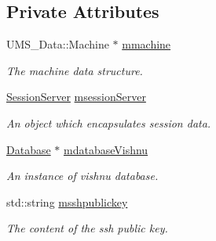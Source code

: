 \subsection*{Private Attributes}
\begin{DoxyCompactItemize}
\item 
\hypertarget{classMachineServer_a48d96e37c0b86de1627eabfab0a16f3a}{
UMS\_\-Data::Machine $\ast$ \hyperlink{classMachineServer_a48d96e37c0b86de1627eabfab0a16f3a}{mmachine}}
\label{classMachineServer_a48d96e37c0b86de1627eabfab0a16f3a}

\begin{DoxyCompactList}\small\item\em The machine data structure. \item\end{DoxyCompactList}\item 
\hypertarget{classMachineServer_a8ad620f122d53ed6114e1a9924857694}{
\hyperlink{classSessionServer}{SessionServer} \hyperlink{classMachineServer_a8ad620f122d53ed6114e1a9924857694}{msessionServer}}
\label{classMachineServer_a8ad620f122d53ed6114e1a9924857694}

\begin{DoxyCompactList}\small\item\em An object which encapsulates session data. \item\end{DoxyCompactList}\item 
\hypertarget{classMachineServer_ae4205cd70c90227760b0c799b67b9f02}{
\hyperlink{classDatabase}{Database} $\ast$ \hyperlink{classMachineServer_ae4205cd70c90227760b0c799b67b9f02}{mdatabaseVishnu}}
\label{classMachineServer_ae4205cd70c90227760b0c799b67b9f02}

\begin{DoxyCompactList}\small\item\em An instance of vishnu database. \item\end{DoxyCompactList}\item 
\hypertarget{classMachineServer_af5b160283015cb15b5da6a4658a06f92}{
std::string \hyperlink{classMachineServer_af5b160283015cb15b5da6a4658a06f92}{msshpublickey}}
\label{classMachineServer_af5b160283015cb15b5da6a4658a06f92}

\begin{DoxyCompactList}\small\item\em The content of the ssh public key. \item\end{DoxyCompactList}\end{DoxyCompactItemize}


